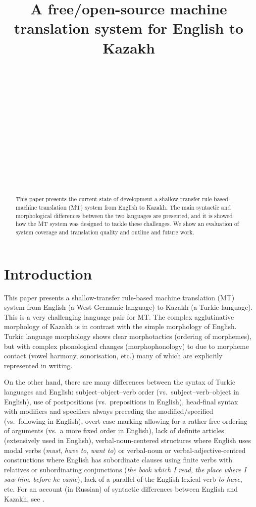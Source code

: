 \documentclass[11pt]{article}
\title{A free/open-source machine translation system for English to Kazakh}
\author{\anonymize{Aida Sundetova}\\
  \anonymize{Kazakh National University, } \\
  \anonymize{050040 Almaty, Kazakhstan} \\
  \anonymize{{\tt sun27aida@gmail.com}}\\
  \And
  \anonymize{\textbf{Francis M. Tyers}}\\
  \anonymize{HSL-fakultehta}\\ 
  \anonymize{UiT Norgga \'{a}rktala\v{s} universitehta} \\
  \anonymize{N-9017 Romsa, Norway} \\
  \anonymize{{\tt francis.tyers@uit.no}}
  \And
  \anonymize{Mikel L.\ Forcada}\\
  \anonymize{Dept.\ Lleng.\ i Sist.\ Informàt.} \\
  \anonymize{Universitat d'Alacant,} \\ 
  \anonymize{E-03071 Alacant, Spain} \\
  \anonymize{{\tt mlf@dlsi.ua.es}}
}
\date{}
\begin{document}
\maketitle 
\renewcommand{\baselinestretch}{0.97} %
 

\begin{abstract}
This paper presents the current state of development a shallow-transfer rule-based machine 
translation (MT) system from English to Kazakh. The main syntactic and morphological differences 
between the two languages are presented, and it is showed how the MT 
system was designed to tackle these challenges. We show an evaluation of system coverage and 
translation quality and outline and future work.
\end{abstract}

\section{Introduction}

This paper presents a shallow-transfer rule-based machine translation (MT) system from English 
(a West Germanic language) to Kazakh (a Turkic language). This is a very challenging language pair for MT.
The complex agglutinative morphology of Kazakh 
is in contrast with the simple morphology of English.
Turkic language morphology shows clear morphotactics (ordering of morphemes), but with 
complex phonological changes (morphophonology) to due to morpheme contact (vowel harmony, 
sonorisation, etc.) many of which are explicitly represented in writing.

On the other hand, there are many differences between the syntax of Turkic languages 
and English: subject–object–verb order (vs.\ subject–verb–object in English), use of 
postpositions (vs.\ prepositions in English), head-final syntax with modifiers and specifiers 
always preceding the modified/specified (vs.\ following in English), overt case marking allowing 
for a rather free ordering of arguments (vs.\ a more fixed order in English), lack of definite 
articles (extensively used in English), verbal-noun-centered structures where English uses modal 
verbs (\emph{must}, \emph{have to}, \emph{want to}) or verbal-noun or verbal-adjective-centred constructions where 
English has subordinate clauses using finite verbs with relatives or subordinating 
conjunctions (\emph{the book which I read}, \emph{the place where I saw him}, \emph{before he came}), lack of a parallel 
of the English lexical verb \emph{to have}, etc. For an account (in Russian) of 
syntactic differences between English and Kazakh, see \cite{pecherskih2012}.
\end{document}
